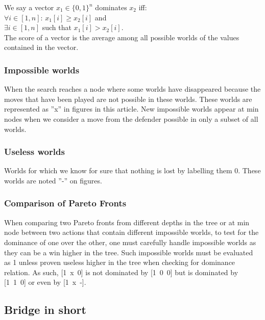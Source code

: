 \documentclass[letterpaper]{article} %
\begin{document}

We say a vector $x_1 \in \{0,1\}^n$ dominates $x_2$ iff:\\

$\forall i  \in [1,n]$: $x_1[i] \geq x_2[i]$ and\\ 

$\exists i \in [1,n]$ such that $x_1[i] > x_2[i].$\\

The score of a vector is the average among all possible worlds of the values contained in the vector.

\subsubsection{Impossible worlds}

When the search reaches a node where some worlds have disappeared because the moves that have been played are not possible in these worlds. These worlds are represented as ''x'' in figures in this article. New impossible worlds appear at min nodes when we consider a move from the defender possible in only a subset of all worlds.

\subsubsection{Useless worlds}

Worlds for which we know for sure that nothing is lost by labelling them 0. These worlds are noted ''-'' on figures. 

\subsubsection{Comparison of Pareto Fronts}

When comparing two Pareto fronts from different depths in the tree or at min node between two actions that contain different impossible worlds, to test for the dominance of one over the other, one must carefully handle impossible worlds as they can be a win higher in the tree. Such impossible worlds must be evaluated as 1 unless proven useless higher in the tree when checking for dominance relation. As such, [1~x~0] is not dominated by [1~0~0] but is dominated by [1~1~0] or even by [1~x~-].

\subsection{Bridge in short}
\end{document}
